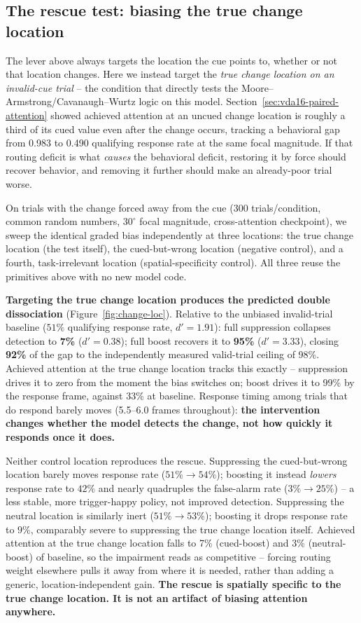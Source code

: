 \documentclass[10pt]{article}
\begin{document}
\subsection{The rescue test: biasing the true change location}\label{sec:pending-intervention}
The lever above always targets the location the cue points to, whether or not that location changes. Here we instead target the \emph{true change location on an invalid-cue trial} -- the condition that directly tests the Moore--Armstrong/Cavanaugh--Wurtz logic on this model. Section~\ref{sec:vda16-paired-attention} showed achieved attention at an uncued change location is roughly a third of its cued value even after the change occurs, tracking a behavioral gap from 0.983 to 0.490 qualifying response rate at the same focal magnitude. If that routing deficit is what \emph{causes} the behavioral deficit, restoring it by force should recover behavior, and removing it further should make an already-poor trial worse.

On trials with the change forced away from the cue (300 trials/condition, common random numbers, $30^\circ$ focal magnitude, cross-attention checkpoint), we sweep the identical graded bias independently at three locations: the true change location (the test itself), the cued-but-wrong location (negative control), and a fourth, task-irrelevant location (spatial-specificity control). All three reuse the primitives above with no new model code.

\textbf{Targeting the true change location produces the predicted double dissociation} (Figure~\ref{fig:change-loc}). Relative to the unbiased invalid-trial baseline ($51\%$ qualifying response rate, $d'=1.91$): full suppression collapses detection to \textbf{7\%} ($d'=0.38$); full boost recovers it to \textbf{95\%} ($d'=3.33$), closing \textbf{92\%} of the gap to the independently measured valid-trial ceiling of 98\%. Achieved attention at the true change location tracks this exactly -- suppression drives it to zero from the moment the bias switches on; boost drives it to 99\% by the response frame, against 33\% at baseline. Response timing among trials that do respond barely moves (5.5--6.0 frames throughout): \textbf{the intervention changes whether the model detects the change, not how quickly it responds once it does.}

Neither control location reproduces the rescue. Suppressing the cued-but-wrong location barely moves response rate ($51\%\to54\%$); boosting it instead \emph{lowers} response rate to $42\%$ and nearly quadruples the false-alarm rate ($3\%\to25\%$) -- a less stable, more trigger-happy policy, not improved detection. Suppressing the neutral location is similarly inert ($51\%\to53\%$); boosting it drops response rate to $9\%$, comparably severe to suppressing the true change location itself. Achieved attention at the true change location falls to 7\% (cued-boost) and 3\% (neutral-boost) of baseline, so the impairment reads as competitive -- forcing routing weight elsewhere pulls it away from where it is needed, rather than adding a generic, location-independent gain. \textbf{The rescue is spatially specific to the true change location. It is not an artifact of biasing attention anywhere.}
\end{document}
